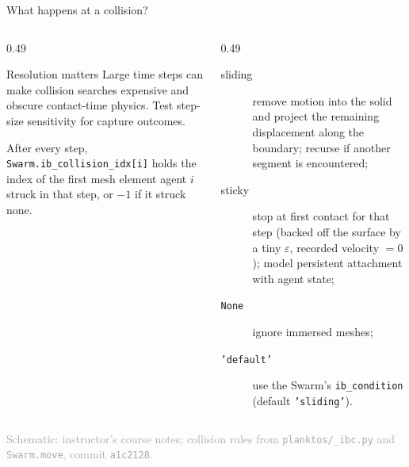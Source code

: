 \documentclass[aspectratio=169,11pt]{beamer}
\newcommand{\sourcecredit}[1]{\vfill\hfill{\tiny\textcolor{DarkGray}{#1}}}
\newcommand{\code}[1]{\texttt{#1}}
\begin{document}
\begin{frame}{What happens at a collision?}
\begin{columns}[T,onlytextwidth]
  \begin{column}{0.49\textwidth}
    \centering
    \vspace{2mm}
    \raggedright
    \begin{alertblock}{Resolution matters}
    \small Large time steps can make collision searches expensive and obscure contact-time physics. Test step-size sensitivity for capture outcomes.
    \end{alertblock}
    {\scriptsize After every step, \code{Swarm.ib\_collision\_idx[i]} holds the index of the first mesh element agent $i$ struck in that step, or $-1$ if it struck none.\par}
  \end{column}
  \begin{column}{0.49\textwidth}
    \begin{description}
      \item[sliding] remove motion into the solid and project the remaining displacement along the boundary; recurse if another segment is encountered;
      \item[sticky] stop at first contact for that step (backed off the surface by a tiny $\varepsilon$, recorded velocity $=0$); model persistent attachment with agent state;
      \item[\code{None}] ignore immersed meshes;
      \item[\code{'default'}] use the Swarm's \code{ib\_condition} (default \code{'sliding'}).
    \end{description}
  \end{column}
\end{columns}
\sourcecredit{Schematic: instructor's course notes; collision rules from \code{planktos/\_ibc.py} and \code{Swarm.move}, commit \code{a1c2128}.}
\end{frame}
\end{document}
